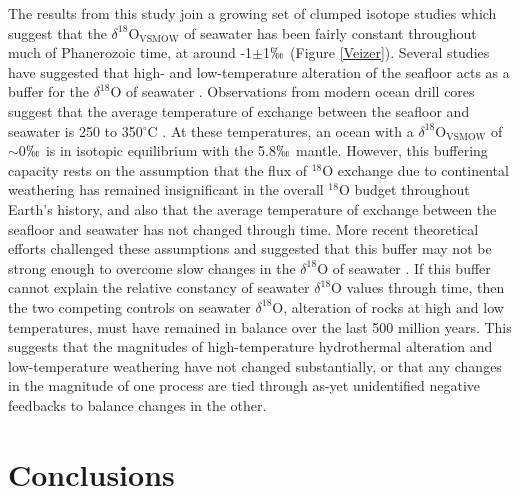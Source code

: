 \documentclass[5p, authoryear]{elsarticle}
\begin{document}
The results from this study join a growing set of clumped isotope studies \citep{Came2007, Dennis2013, Finnegan2011} which suggest that the $\delta^{18}$O$_{\text{VSMOW}}$ of seawater has been fairly constant throughout much of Phanerozoic time, at around -1$\pm$1$\permil$ (Figure \ref{Veizer}). Several studies have suggested that high- and low-temperature alteration of the seafloor acts as a buffer for the $\delta^{18}$O of seawater \citep{Gregory1981, Gregory1991, Muehlenbachs1976, Muehlenbachs1998}. Observations from modern ocean drill cores suggest that the average temperature of exchange between the seafloor and seawater is 250 to 350$^{\circ}$C \citep{Muehlenbachs1998}. At these temperatures, an ocean with a $\delta^{18}$O$_{\text{VSMOW}}$ of $\sim$0$\permil$ is in isotopic equilibrium with the 5.8$\permil$ mantle. However, this buffering capacity rests on the assumption that the flux of $^{18}$O exchange due to continental weathering has remained insignificant in the overall $^{18}$O budget throughout Earth’s history, and also that the average temperature of exchange between the seafloor and seawater has not changed through time. More recent theoretical efforts challenged these assumptions and suggested that this buffer may not be strong enough to overcome slow changes in the $\delta^{18}$O of seawater \citep{Jaffres2007}. If this buffer cannot explain the relative constancy of seawater $\delta^{18}$O values through time, then the two competing controls on seawater $\delta^{18}$O, alteration of rocks at high and low temperatures, must have remained in balance over the last 500 million years. This suggests that the magnitudes of high-temperature hydrothermal alteration and low-temperature weathering have not changed substantially, or that any changes in the magnitude of one process are tied through as-yet unidentified negative feedbacks to balance changes in the other. 

\section{Conclusions}
\end{document}
